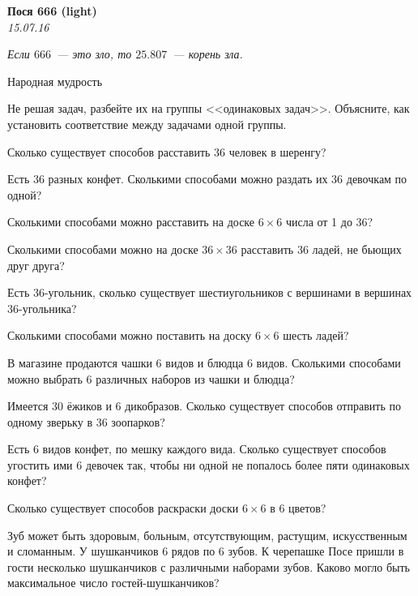 \begin{center}
\textbf{\Large Пося 666 (light)}\\
\textit{15.07.16}
\end{center}

\epigraph{\it Если $666$~--- это зло, то $25.807$~--- корень зла.}{Народная мудрость}

Не решая задач, разбейте их на группы <<одинаковых задач>>. Объясните, как установить соответствие между задачами одной группы.

\begin{problems}
\item Сколько существует способов расставить 36 человек в шеренгу? %

\item Есть 36 разных конфет. Сколькими способами можно раздать их 36 девочкам по одной? %

\item Сколькими способами можно расставить на доске $6\times6$ числа от 1 до 36? %

\item Сколькими способами можно на доске $36\times36$  расставить 36 ладей, не бьющих друг друга? %

\item Есть 36-угольник, сколько существует шестиугольников с вершинами в вершинах 36-угольника? %

\item Сколькими способами можно поставить на доску $6\times6$ шесть ладей? %

\item В магазине продаются чашки 6 видов и блюдца 6 видов. Сколькими способами можно выбрать 6 различных наборов из чашки и блюдца? %

\item Имеется 30 ёжиков и 6 дикобразов. Сколько существует способов отправить по одному зверьку в 36 зоопарков? %

\item Есть 6 видов конфет, по мешку каждого вида. Сколько существует способов угостить ими 6 девочек так, чтобы ни одной не попалось более пяти одинаковых конфет? %

\item Сколько существует способов раскраски доски $6\times6$ в 6 цветов? %

\item Зуб может быть здоровым, больным, отсутствующим, растущим, искусственным и сломанным. У шушканчиков 6 рядов по 6 зубов. К черепашке Посе пришли в гости несколько шушканчиков с различными наборами зубов. Каково могло быть максимальное число гостей-шушканчиков? %


\end{problems}
